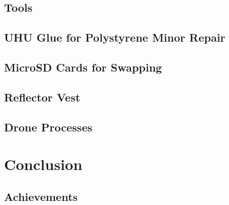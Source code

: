 \documentclass[a4paper,12pt,twoside]{article}
\begin{document}
\subsection{Tools}

\begin{multicols}{2}
\lipsum[0-5]
\end{multicols}

\subsection{UHU Glue for Polystyrene Minor Repair}

\begin{multicols}{2}
\lipsum[0-5]
\end{multicols}

\subsection{MicroSD Cards for Swapping}

\begin{multicols}{2}
\lipsum[0-5]
\end{multicols}

\subsection{Reflector Vest}

\begin{multicols}{2}
\lipsum[0-5]
\end{multicols}

\subsection{Drone Processes}

\begin{multicols}{2}
\lipsum[0-5]
\end{multicols}

\section{Conclusion}

\begin{multicols}{2}
\lipsum[0-5]
\end{multicols}

\subsection{Achievements}
\end{document}
